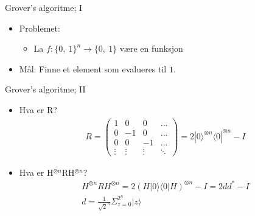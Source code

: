 \documentclass[norsk]{beamer}
\begin{document}
	\begin{frame}{Grover's algoritme; I}
		\begin{itemize}
			\item Problemet:
				\begin{itemize}
					\item La $f : \{0,\ 1\}^n \rightarrow \{0,\ 1\}$ være en funksjon
				\end{itemize}

			\item Mål: Finne et element som evalueres til $1$.

				
		\end{itemize}
	\end{frame}

	\begin{frame}{Grover's algoritme; II}
		\begin{itemize}
			\item Hva er R?
			\begin{align*}
				R = \begin{pmatrix*}
					1 & 0 & 0 & ... \\
					0 & -1 & 0 & ... \\
					0 & 0 & -1 & ... \\
					\vdots & \vdots & \vdots & \ddots
				\end{pmatrix*} = 2|0\rangle^{\otimes n}\langle 0|^{\otimes n} - I
			\end{align*}
			\item Hva er H$^{\otimes n}$RH$^{\otimes n}$?
			\begin{align*}
				H^{\otimes n}RH^{\otimes n} = 2(H|0\rangle\langle 0|H)^{\otimes n}-I = 2dd^*-I \\
				d = \frac{1}{\sqrt{2}^n}\Sigma_{z=0}^{2^n}|z\rangle
			\end{align*}
		\end{itemize}		
	\end{frame}
\end{document}
